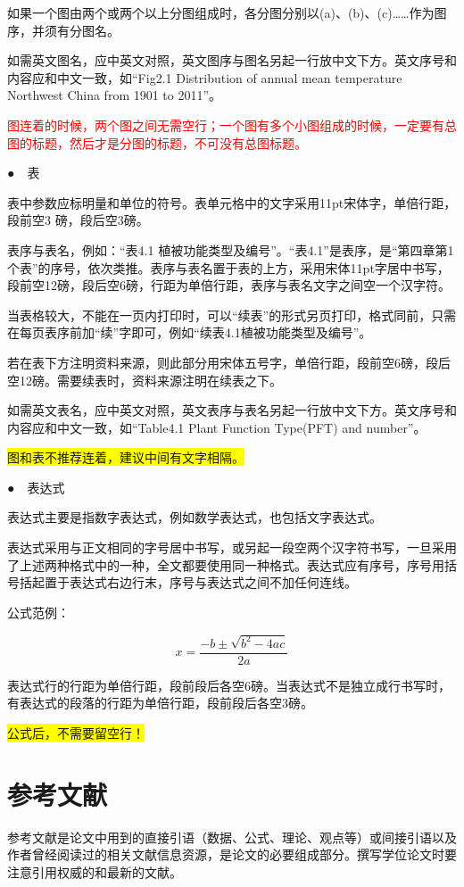 如果一个图由两个或两个以上分图组成时，各分图分别以(a)、(b)、(c)……作为图序，并须有分图名。

如需英文图名，应中英文对照，英文图序与图名另起一行放中文下方。英文序号和内容应和中文一致，如“Fig2.1 Distribution of annual mean temperature Northwest China from 1901 to 2011”。

\textcolor{red}{图连着的时候，两个图之间无需空行；一个图有多个小图组成的时候，一定要有总图的标题，然后才是分图的标题，不可没有总图标题。}

●　表

表中参数应标明量和单位的符号。表单元格中的文字采用11pt宋体字，单倍行距，段前空3 磅，段后空3磅。

表序与表名，例如：“表4.1  植被功能类型及编号”。“表4.1”是表序，是“第四章第1个表”的序号，依次类推。表序与表名置于表的上方，采用宋体11pt字居中书写，段前空12磅，段后空6磅，行距为单倍行距，表序与表名文字之间空一个汉字符。

当表格较大，不能在一页内打印时，可以“续表”的形式另页打印，格式同前，只需在每页表序前加“续”字即可，例如“续表4.1植被功能类型及编号”。

若在表下方注明资料来源，则此部分用宋体五号字，单倍行距，段前空6磅，段后空12磅。需要续表时，资料来源注明在续表之下。

如需英文表名，应中英文对照，英文表序与表名另起一行放中文下方。英文序号和内容应和中文一致，如“Table4.1 Plant Function Type(PFT) and number”。

\colorbox {yellow}{图和表不推荐连着，建议中间有文字相隔。}

●　表达式

表达式主要是指数字表达式，例如数学表达式，也包括文字表达式。

表达式采用与正文相同的字号居中书写，或另起一段空两个汉字符书写，一旦采用了上述两种格式中的一种，全文都要使用同一种格式。表达式应有序号，序号用括号括起置于表达式右边行末，序号与表达式之间不加任何连线。

公式范例：

\begin{equation}
x=\frac{-b\pm\sqrt{b^2-4ac}}{2a}
\end{equation}

表达式行的行距为单倍行距，段前段后各空6磅。当表达式不是独立成行书写时，有表达式的段落的行距为单倍行距，段前段后各空3磅。

\colorbox {yellow}{公式后，不需要留空行！}

\section{参考文献}
参考文献是论文中用到的直接引语（数据、公式、理论、观点等）或间接引语以及作者曾经阅读过的相关文献信息资源，是论文的必要组成部分。撰写学位论文时要注意引用权威的和最新的文献。

